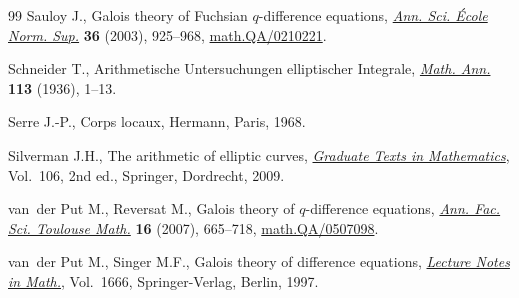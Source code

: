 \documentclass[pdftex]{sigma}
\numberwithin{equation}{section}
\begin{document}
\begin{thebibliography}{99}
Sauloy J., Galois theory of {F}uchsian {$q$}-dif\/ference equations,
\href{http://dx.doi.org/10.1016/j.ansens.2002.10.001}{\textit{Ann. Sci. \'Ecole Norm. Sup.}} \textbf{36} (2003), 925--968, \href{http://arxiv.org/abs/math.QA/0210221}{math.QA/0210221}.

Schneider T., {A}rithmetische {U}ntersuchungen elliptischer {I}ntegrale,
\href{http://dx.doi.org/10.1007/BF01571618}{\textit{Math. Ann.}} \textbf{113} (1936), 1--13.

Serre J.-P., Corps locaux, Hermann, Paris, 1968.

Silverman J.H., The arithmetic of elliptic curves, \href{http://dx.doi.org/10.1007/978-0-387-09494-6}{\textit{Graduate Texts in Mathematics}}, Vol.~106, 2nd ed., Sprin\-ger, Dordrecht, 2009.

van~der Put M., Reversat M., Galois theory of {$q$}-dif\/ference equations,
\href{http://dx.doi.org/10.5802/afst.1164}{\textit{Ann. Fac. Sci. Toulouse Math.}} \textbf{16} (2007), 665--718, \href{http://arxiv.org/abs/math.QA/0507098}{math.QA/0507098}.

van~der Put M., Singer M.F., Galois theory of dif\/ference equations,
\href{http://dx.doi.org/10.1007/BFb0096118}{\textit{Lecture Notes in Math.}}, Vol.~1666, Springer-Verlag, Berlin, 1997.

\end{thebibliography}
\LastPageEnding
\end{document}
